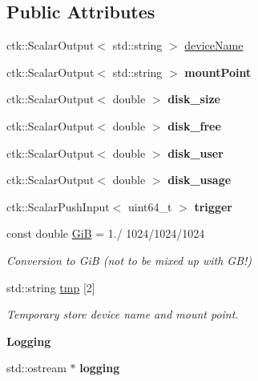 \subsection*{Public Attributes}
\begin{DoxyCompactItemize}
\item 
ctk\+::\+Scalar\+Output$<$ std\+::string $>$ \hyperlink{structFileSystemModule_a1f0d9c5b8ee4bf06a7ea0d5cb0205eeb}{device\+Name}
\item 
ctk\+::\+Scalar\+Output$<$ std\+::string $>$ {\bfseries mount\+Point}
\item 
ctk\+::\+Scalar\+Output$<$ double $>$ {\bfseries disk\+\_\+size}
\item 
ctk\+::\+Scalar\+Output$<$ double $>$ {\bfseries disk\+\_\+free}
\item 
ctk\+::\+Scalar\+Output$<$ double $>$ {\bfseries disk\+\_\+user}
\item 
ctk\+::\+Scalar\+Output$<$ double $>$ {\bfseries disk\+\_\+usage}
\item 
ctk\+::\+Scalar\+Push\+Input$<$ uint64\+\_\+t $>$ {\bfseries trigger}
\item 
const double \hyperlink{structFileSystemModule_ae1467aa618390c54862d14806571f6d7}{GiB} = 1./ 1024/1024/1024\hypertarget{structFileSystemModule_ae1467aa618390c54862d14806571f6d7}{}\label{structFileSystemModule_ae1467aa618390c54862d14806571f6d7}

\begin{DoxyCompactList}\small\item\em Conversion to GiB (not to be mixed up with G\+B!) \end{DoxyCompactList}\item 
std\+::string \hyperlink{structFileSystemModule_aa603ec6c7cf976b9fffcc632d6325f2e}{tmp} \mbox{[}2\mbox{]}\hypertarget{structFileSystemModule_aa603ec6c7cf976b9fffcc632d6325f2e}{}\label{structFileSystemModule_aa603ec6c7cf976b9fffcc632d6325f2e}

\begin{DoxyCompactList}\small\item\em Temporary store device name and mount point. \end{DoxyCompactList}\end{DoxyCompactItemize}
\begin{Indent}{\bf Logging}\par
\begin{DoxyCompactItemize}
\item 
std\+::ostream $\ast$ {\bfseries logging}\hypertarget{structFileSystemModule_a7c65b6ac38ea9847ebc98e679b835cdb}{}\label{structFileSystemModule_a7c65b6ac38ea9847ebc98e679b835cdb}

\end{DoxyCompactItemize}
\end{Indent}


